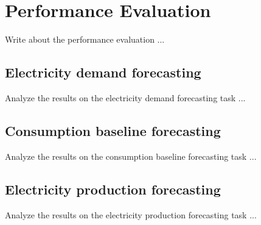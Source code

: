 \chapter{Performance Evaluation}
\label{cha:evaluation}
\vspace{0.4 cm}

Write about the performance evaluation ...


\section{Electricity demand forecasting}
\label{sec:demandval}
\vspace{0.2 cm}

Analyze the results on the electricity demand forecasting task ...


\section{Consumption baseline forecasting}
\label{sec:baselineval}
\vspace{0.2 cm}

Analyze the results on the consumption baseline forecasting task ...


\section{Electricity production forecasting}
\label{sec:productionval}
\vspace{0.2 cm}

Analyze the results on the electricity production forecasting task ...

